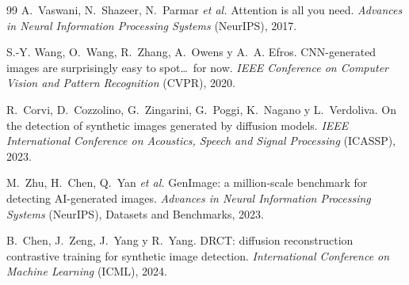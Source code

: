 \documentclass[11pt,a4paper]{article}
\theoremstyle{plain}
\begin{document}
\begin{thebibliography}{99}
A.~Vaswani, N.~Shazeer, N.~Parmar \emph{et al.}
Attention is all you need.
\emph{Advances in Neural Information Processing Systems} (NeurIPS), 2017.

S.-Y. Wang, O.~Wang, R.~Zhang, A.~Owens y A.~A. Efros.
CNN-generated images are surprisingly easy to spot\dots\ for now.
\emph{IEEE Conference on Computer Vision and Pattern Recognition}
(CVPR), 2020.

R.~Corvi, D.~Cozzolino, G.~Zingarini, G.~Poggi, K.~Nagano y
L.~Verdoliva.
On the detection of synthetic images generated by diffusion models.
\emph{IEEE International Conference on Acoustics, Speech and Signal
Processing} (ICASSP), 2023.

M.~Zhu, H.~Chen, Q.~Yan \emph{et al.}
GenImage: a million-scale benchmark for detecting AI-generated images.
\emph{Advances in Neural Information Processing Systems} (NeurIPS),
Datasets and Benchmarks, 2023.

B.~Chen, J.~Zeng, J.~Yang y R.~Yang.
DRCT: diffusion reconstruction contrastive training for synthetic image
detection.
\emph{International Conference on Machine Learning} (ICML), 2024.

\end{thebibliography}
\end{document}
